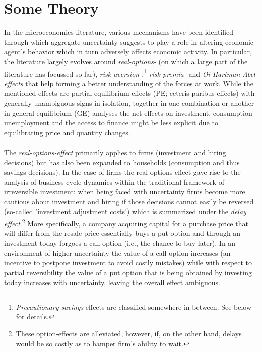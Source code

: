 \documentclass[a4paper,11pt,listof=nochaptergap,oneside,pointednumbers,bibtotoc,bigheadings,liststotoc]{scrbook}
\theoremstyle{mysatz}
\theoremstyle{mydefinition}
\theoremstyle{mybemerkung}
\begin{document}
\section{Some Theory}


In the microeconomics literature, various mechanisms have been identified through which aggregate uncertainty suggests to play a role in altering economic agent's behavior which in turn adversely affects economic activity. In particular, the literature largely evolves around \textit{real-options-} (on which a large part of the literature has focussed so far), \textit{risk-aversion-},\footnote{\textit{Precautionary savings} effects are classified somewhere in-between. See below for details.} \textit{risk premia-} and \textit{Oi-Hartman-Abel effects} that help forming a better understanding of the forces at work. While the mentioned effects are partial equilibrium effects (PE; ceteris paribus effects) with generally unambiguous signs in isolation, together in one combination or another in general equilibrium (GE) analyses the net effects on investment, consumption unemployment and the access to finance might be less explicit due to equilibrating price and quantity changes.\\
\\
The \textit{real-options-effect} primarily applies to firms (investment and hiring decisions) but has also been expanded to households (consumption and thus savings decisions). In the case of firms the real-options effect gave rise to the analysis of business cycle dynamics within the traditional framework of irreversible investment: when being faced with uncertainty firms become more cautious about investment and hiring if those decisions cannot easily be reversed (so-called 'investment adjustment costs') which is summarized under the \textit{delay effect}.\footnote{These option-effects are alleviated, however, if, on the other hand, delays would be so costly as to hamper firm's ability to wait.} More specifically, a company acquiring capital for a purchase price that will differ from the resale price essentially buys a put option and through an investment today forgoes a call option (i.e., the chance to buy later). In an environment of higher uncertainty the value of a call option increases (an incentive to postpone investment to avoid costly mistakes) while with respect to partial reversibility the value of a put option that is being obtained by investing today increases with uncertainty, leaving the overall effect ambiguous. \\
\end{document}
